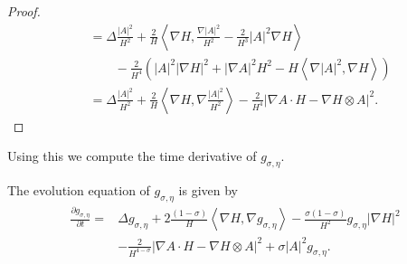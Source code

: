 \begin{proof}
\begin{align*}
        & = \Delta \frac{|A|^{2}}{H^{2}} + \frac{2}{H} \left< \nabla H, \frac{\nabla |A|^{2}}{H^{2}} - \frac{2}{H^{3}}|A|^{2} \nabla H \right>  \\
        & \qquad - \frac{2}{H^{4}}\left( |A|^{2}|\nabla H|^{2} + | \nabla A|^{2}H^{2} - H\left< \nabla |A|^{2}, \nabla H \right> \right) \\
        & = \Delta \frac{|A|^{2}}{H^{2}}+ \frac{2}{H} \left< \nabla H , \nabla \frac{ |A|^{2}}{H^{2}}\right>  - \frac{2}{H^{4}}|\nabla A \cdot H - \nabla H \otimes A|^{2}.
    \end{align*}
\end{proof} 
Using this we compute the time derivative of $ g_{\sigma, \eta} $.
\begin{lemma}\label{Deltag}
    The evolution equation of $ g_{\sigma, \eta} $ is given by 
    \begin{align}
        \frac{ \partial g_{\sigma, \eta}}{ \partial t} =& \Delta g_{\sigma, \eta} + 2\frac{(1-\sigma)}{H}\left< \nabla H, \nabla g_{\sigma, \eta} \right> - \frac{\sigma (1-\sigma)}{H^{2}}g_{\sigma, \eta} | \nabla H|^{2} \nonumber\\
    &  - \frac{2}{H^{4-\sigma}}|\nabla A \cdot H - \nabla H \otimes A|^{2} + \sigma |A|^{2} g_{\sigma, \eta}\label{gequation}.
    \end{align}
\end{lemma}
